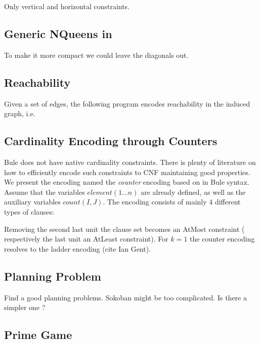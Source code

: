 \documentclass[conference]{IEEEtran}
\begin{document}
Only vertical and horizontal constraints.



\subsection{Generic NQueens in \bfull}



To make it more compact we could leave the diagonals out. 

\subsection{Reachability}

Given a set of edges, the following program encodes reachability in the induced graph, i.e. 



\subsection{Cardinality Encoding through Counters}

Bule does not have native cardinality constraints. 
There is plenty of literature on how to efficiently encode such constraints to CNF maintaining good properties. 
We present the encoding named the \emph{counter} encoding based on \cite{Sinz05} in Bule syntax.
Assume that the variables $element(1\ldots n)$ are already defined, as well as 
the auxiliary variables $count(I,J)$. 
The encoding consists of mainly 4 different types of clauses: 



Removing the second last unit the clause set becomes an AtMost constraint ( respectively the last unit an AtLeast constraint). 
For $k=1$ the counter encoding resolves to the ladder encoding (cite Ian Gent). 

\subsection{Planning Problem}

Find a good planning problems. 
Sokoban might be too complicated. 
Is there a simpler one ? 

\subsection{Prime Game}
\end{document}
